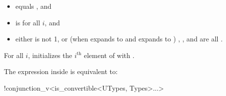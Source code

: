 \documentclass{wg21}
\begin{document}
\begin{itemdescr}
    \pnum
    \constraints
    \begin{itemize}
        \item
         equals , and
        
        \item
         is  for all $i$, and
        
        \item
        either
         is not 1, or
        (when  expands to  and  expands to )
        , ,
        and  are all .
    \end{itemize}
    
    \pnum
    \effects
    For all $i$,
    initializes the $i^\text{th}$ element of  with
    .
    
    \pnum
    \remarks
    The expression inside  is equivalent to:
    \begin{codeblock}
        !conjunction_v<is_convertible<UTypes, Types>...>
    \end{codeblock}
\end{itemdescr}
\end{document}
